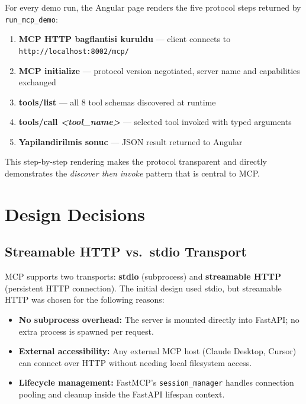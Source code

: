 \documentclass[11pt,a4paper]{article}
\begin{document}
For every demo run, the Angular page renders the five protocol steps returned by
\texttt{run\_mcp\_demo}:

\begin{enumerate}[leftmargin=1.5em]
    \item \textbf{MCP HTTP bagflantisi kuruldu} --- client connects to
          \texttt{http://localhost:8002/mcp/}
    \item \textbf{MCP initialize} --- protocol version negotiated,
          server name and capabilities exchanged
    \item \textbf{tools/list} --- all 8 tool schemas discovered at runtime
    \item \textbf{tools/call \textit{<tool\_name>}} --- selected tool invoked
          with typed arguments
    \item \textbf{Yapilandirilmis sonuc} --- JSON result returned to Angular
\end{enumerate}

This step-by-step rendering makes the protocol transparent and directly demonstrates
the \textit{discover then invoke} pattern that is central to MCP.

\section{Design Decisions}

\subsection{Streamable HTTP vs.\ stdio Transport}

MCP supports two transports: \textbf{stdio} (subprocess) and
\textbf{streamable HTTP} (persistent HTTP connection). The initial design used
stdio, but streamable HTTP was chosen for the following reasons:

\begin{rationale}
\begin{itemize}[leftmargin=1.2em]
    \item \textbf{No subprocess overhead:} The server is mounted directly into
          FastAPI; no extra process is spawned per request.
    \item \textbf{External accessibility:} Any external MCP host (Claude Desktop,
          Cursor) can connect over HTTP without needing local filesystem access.
    \item \textbf{Lifecycle management:} FastMCP's \texttt{session\_manager} handles
          connection pooling and cleanup inside the FastAPI lifespan context.
\end{itemize}
\end{rationale}
\end{document}
